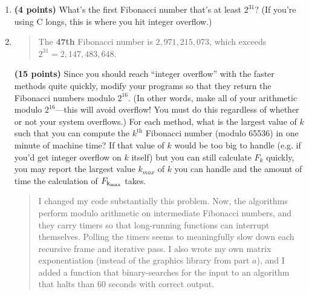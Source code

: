 \documentclass[11pt]{article}
\begin{document}
\begin{enumerate}[leftmargin=*]
\begin{enumerate}
\begin{quote}
  \medskip
  And new times. My matrix implementation and iterative are the same here, but the difference is at the nanosecond level, so asymptotic behavior is much more effectively approximated by the 16 second tests.
  \begin{itemize}
    \item Recursive: 15.025ms
    \item Iterative: 125ns
    \item Matrix (my implementation): n = 125ns
    \item Matrix (nalgebra crate): n = 83ns
  \end{itemize}
\end{quote}
\item
{\bf (4 points)}
What's the first Fibonacci number that's at least $2^{31}$? (If you're using C longs, this is where you hit
integer overflow.)
\item
  \begin{quote}
    \color{purple}
  The \textbf{47th} Fibonacci number is $2,971,215,073$, which exceeds $2^{31} = 2,147,483,648$. 
  \end{quote}
{\bf (15 points)}
Since you should reach ``integer overflow'' with the faster methods quite quickly, modify your programs
so that they return the Fibonacci numbers modulo $2^{16}$. (In other words, make all of your
arithmetic modulo $2^{16}$---this will avoid overflow! You must do this regardless of whether or not your
system overflows.) For each method, what is the largest value of $k$ such that you can compute the
$k^\text{th}$ Fibonacci number (modulo 65536) in one minute of machine time? If that value of $k$ would be too big to handle (e.g. if you'd get integer overflow on $k$ itself) but you can still calculate $F_{k}$ quickly, you may report the largest value $k_{max}$ of $k$ you can handle and the amount of time the calculation of $F_{\rm k_{max}}$ takes. 
\begin{quote}
  \color{purple}
  I changed my code substantially this problem. Now, the algorithms perform modulo arithmetic on intermediate Fibonacci numbers, and they carry timers so that long-running functions can interrupt themselves. Polling the timers seems to meaningfully slow down each recursive frame and iterative pass. I also wrote my own matrix exponentiation (instead of the graphics library from part $a$), and I added a function that binary-searches for the input to an algorithm that halts than 60 seconds with correct output. 


\end{quote}
\end{enumerate}
\end{enumerate}
\end{document}
